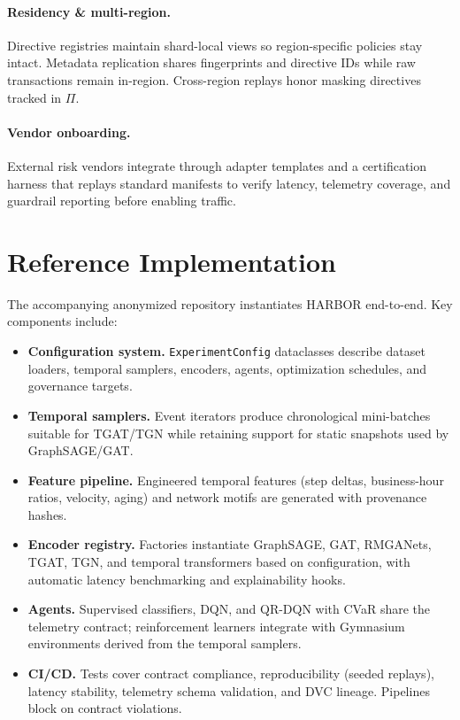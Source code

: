 \documentclass[letterpaper]{article}
\begin{document}
\paragraph{Residency \& multi-region.} Directive registries maintain shard-local views so region-specific policies stay intact. Metadata replication shares fingerprints and directive IDs while raw transactions remain in-region. Cross-region replays honor masking directives tracked in $\Pi$.

\paragraph{Vendor onboarding.} External risk vendors integrate through adapter templates and a certification harness that replays standard manifests to verify latency, telemetry coverage, and guardrail reporting before enabling traffic.

\section{Reference Implementation}
\label{sec:implementation}
The accompanying anonymized repository instantiates HARBOR end-to-end. Key components include:
\begin{itemize}
    \item \textbf{Configuration system.} \texttt{ExperimentConfig} dataclasses describe dataset loaders, temporal samplers, encoders, agents, optimization schedules, and governance targets.
    \item \textbf{Temporal samplers.} Event iterators produce chronological mini-batches suitable for TGAT/TGN while retaining support for static snapshots used by GraphSAGE/GAT.
    \item \textbf{Feature pipeline.} Engineered temporal features (step deltas, business-hour ratios, velocity, aging) and network motifs are generated with provenance hashes.
    \item \textbf{Encoder registry.} Factories instantiate GraphSAGE, GAT, RMGANets, TGAT, TGN, and temporal transformers based on configuration, with automatic latency benchmarking and explainability hooks.
    \item \textbf{Agents.} Supervised classifiers, DQN, and QR-DQN with CVaR share the telemetry contract; reinforcement learners integrate with Gymnasium environments derived from the temporal samplers.
    \item \textbf{CI/CD.} Tests cover contract compliance, reproducibility (seeded replays), latency stability, telemetry schema validation, and DVC lineage. Pipelines block on contract violations.
\end{itemize}
\end{document}
